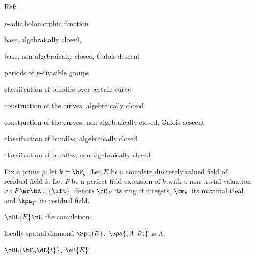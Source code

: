 \documentclass[0-main]{subfiles}
\begin{document}
\ifSubfilesClassLoaded{
	\tableofcontents
}{}


Ref:~\cite{FF2018}.

\begin{enr}
	\item $p$-adic holomorphic function
	\item base, algebraically closed,
	\item base, non algebraically closed, Galois descent
	\item periods of $p$-divisible groups
	\item classification of bundles over certain curve
	\item *construction of the curves, algebraically closed
	\item *construction of the curves, non algebraically closed, Galois descent
	\item *classification of bundles, algebraically closed
	\item *classification of bundles, non algebraically closed
\end{enr}


\begin{stp}
	Fix a prime $p$, let $k=\bF_{q}$. Let $E$ be a complete discretely valued field of residual field $k$. Let $F$ be a perfect field extension of $k$ with a non-trivial valuation $v:F\ar\bR\cup\{\ift\}$, denote $\cO_{F}$ its ring of integers, $\km_{F}$ its maximal ideal and $\kpa_{F}$ its residual field.
\end{stp}



$\oHL{E}\xL$ the completion.

locally spatial diamond $\Spd{E}$, $\Spa{(A,B)}$ is A,

$\oHL{\bF_{p}\dR{t}}$. $\oB{E}$



\ifSubfilesClassLoaded{
	
	
}{}
\end{document}
